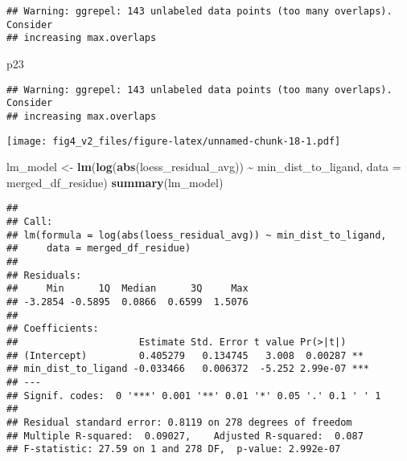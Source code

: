 \documentclass[
]{article}
\newenvironment{Shaded}{\begin{snugshade}}{\end{snugshade}}
\newcommand{\AttributeTok}[1]{\textcolor[rgb]{0.13,0.29,0.53}{#1}}
\newcommand{\FunctionTok}[1]{\textcolor[rgb]{0.13,0.29,0.53}{\textbf{#1}}}
\newcommand{\NormalTok}[1]{#1}
\newcommand{\OtherTok}[1]{\textcolor[rgb]{0.56,0.35,0.01}{#1}}
\newcommand{\SpecialCharTok}[1]{\textcolor[rgb]{0.81,0.36,0.00}{\textbf{#1}}}
\begin{document}
\begin{verbatim}
## Warning: ggrepel: 143 unlabeled data points (too many overlaps). Consider
## increasing max.overlaps
\end{verbatim}

\begin{Shaded}
\begin{Highlighting}[]
\NormalTok{p23}
\end{Highlighting}
\end{Shaded}

\begin{verbatim}
## Warning: ggrepel: 143 unlabeled data points (too many overlaps). Consider
## increasing max.overlaps
\end{verbatim}

\texttt{[image: fig4\_v2\_files/figure-latex/unnamed-chunk-18-1.pdf]}

\begin{Shaded}
\begin{Highlighting}[]
\NormalTok{lm\_model }\OtherTok{\textless{}{-}} \FunctionTok{lm}\NormalTok{(}\FunctionTok{log}\NormalTok{(}\FunctionTok{abs}\NormalTok{(loess\_residual\_avg)) }\SpecialCharTok{\textasciitilde{}}\NormalTok{ min\_dist\_to\_ligand, }\AttributeTok{data =}\NormalTok{ merged\_df\_residue)}
\FunctionTok{summary}\NormalTok{(lm\_model)}
\end{Highlighting}
\end{Shaded}

\begin{verbatim}
## 
## Call:
## lm(formula = log(abs(loess_residual_avg)) ~ min_dist_to_ligand, 
##     data = merged_df_residue)
## 
## Residuals:
##     Min      1Q  Median      3Q     Max 
## -3.2854 -0.5895  0.0866  0.6599  1.5076 
## 
## Coefficients:
##                     Estimate Std. Error t value Pr(>|t|)    
## (Intercept)         0.405279   0.134745   3.008  0.00287 ** 
## min_dist_to_ligand -0.033466   0.006372  -5.252 2.99e-07 ***
## ---
## Signif. codes:  0 '***' 0.001 '**' 0.01 '*' 0.05 '.' 0.1 ' ' 1
## 
## Residual standard error: 0.8119 on 278 degrees of freedom
## Multiple R-squared:  0.09027,    Adjusted R-squared:  0.087 
## F-statistic: 27.59 on 1 and 278 DF,  p-value: 2.992e-07
\end{verbatim}
\end{document}
